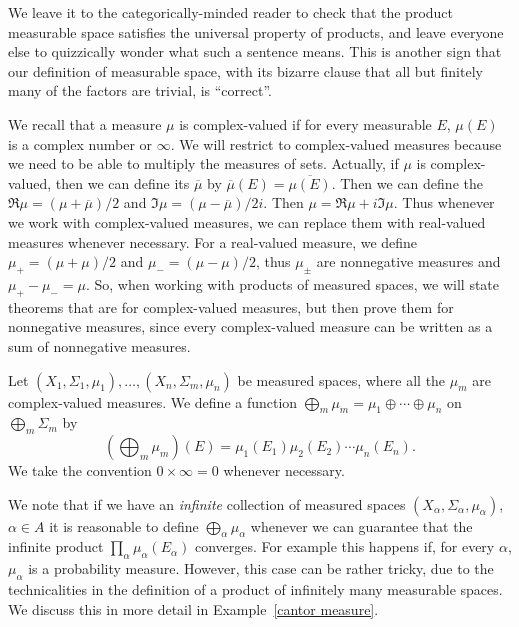 We leave it to the categorically-minded reader to check that the product measurable space satisfies the universal property of products, and leave everyone else to quizzically wonder what such a sentence means.
This is another sign that our definition of measurable space, with its bizarre clause that all but finitely many of the factors are trivial, is ``correct''.

We recall that a measure $\mu$ is complex-valued if for every measurable $E$, $\mu(E)$ is a complex number or $\infty$.
We will restrict to complex-valued measures because we need to be able to multiply the measures of sets.
Actually, if $\mu$ is complex-valued, then we can define its  $\overline \mu$ by $\overline \mu(E) = \overline{\mu(E)}$.
Then we can define the  $\Re \mu = (\mu + \overline \mu)/2$ and  $\Im \mu = (\mu - \overline \mu)/2i$.
Then $\mu = \Re \mu + i\Im \mu$.
Thus whenever we work with complex-valued measures, we can replace them with real-valued measures whenever necessary.
For a real-valued measure, we define $\mu_+ = (\mu + \mu)/2$ and $\mu_- = (\mu - \mu)/2$, thus $\mu_{\pm}$ are nonnegative measures and $\mu_+ - \mu_- = \mu$.
So, when working with products of measured spaces, we will state theorems that are for complex-valued measures, but then prove them for nonnegative measures, since every complex-valued measure can be written as a sum of nonnegative measures.

\begin{definition}
Let $(X_{1}, \Sigma_{1}, \mu_{1}), \dots, (X_{n}, \Sigma_{m}, \mu_{n})$ be measured spaces, where all the $\mu_{m}$ are complex-valued measures.
We define a function $\bigoplus_{m} \mu_{m} = \mu_{1} \oplus \cdots \oplus \mu_{n}$ on $\bigoplus_{m} \Sigma_{m}$ by
\[\left(\bigoplus_{m} \mu_{m}\right)(E) = \mu_{1}(E_{1})\mu_{2}(E_{2}) \cdots \mu_{n}(E_{n}).\]
We take the convention $0 \times \infty = 0$ whenever necessary.
\end{definition}

We note that if we have an \emph{infinite} collection of measured spaces $(X_{\alpha}, \Sigma_{\alpha}, \mu_{\alpha})$, $\alpha \in A$ it is reasonable to define $\bigoplus_{\alpha} \mu_{\alpha}$ whenever we can guarantee that the infinite product $\prod_{\alpha} \mu_{\alpha}(E_{\alpha})$ converges.
For example this happens if, for every $\alpha$, $\mu_{\alpha}$ is a probability measure.
However, this case can be rather tricky, due to the technicalities in the definition of a product of infinitely many measurable spaces.
We discuss this in more detail in Example~\ref{cantor measure}.

